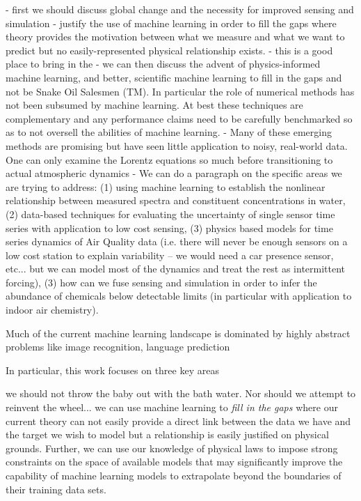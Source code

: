 - first we should discuss global change and the necessity for improved sensing and simulation
- justify the use of machine learning in order to fill the gaps where theory provides the motivation between what we measure and what we want to predict but no easily-represented physical relationship exists.
- this is a good place to bring in the
- we can then discuss the advent of physics-informed machine learning, and better, scientific machine learning to fill in the gaps and not be Snake Oil Salesmen (TM). In particular the role of numerical methods has not been subsumed by machine learning. At best these techniques are complementary and any performance claims need to be carefully benchmarked so as to not oversell the abilities of machine learning.
- Many of these emerging methods are promising but have seen little application to noisy, real-world data. One can only examine the Lorentz equations so much before transitioning to actual atmospheric dynamics
- We can do a paragraph on the specific areas we are trying to address: (1) using machine learning to establish the nonlinear relationship between measured spectra and constituent concentrations in water, (2) data-based techniques for evaluating the uncertainty of single sensor time series with application to low cost sensing, (3) physics based models for time series dynamics of Air Quality data (i.e. there will never be enough sensors on a low cost station to explain variability -- we would need a car presence sensor, etc... but we can model most of the dynamics and treat the rest as intermittent forcing), (3) how can we fuse sensing and simulation in order to infer the abundance of chemicals below detectable limits (in particular with application to indoor air chemistry).




Much of the current machine learning landscape is dominated by highly abstract problems like image recognition, language prediction

In particular, this work focuses on three key areas

we should not throw the baby out with the bath water. Nor should we attempt to reinvent the wheel... we can use machine learning to \textit{fill in the gaps} where our current theory can not easily provide a direct link between the data we have and the target we wish to model but a relationship is easily justified on physical grounds. Further, we can use our knowledge of physical laws to impose strong constraints on the space of available models that may significantly improve the capability of machine learning models to extrapolate beyond the boundaries of their training data sets. 

